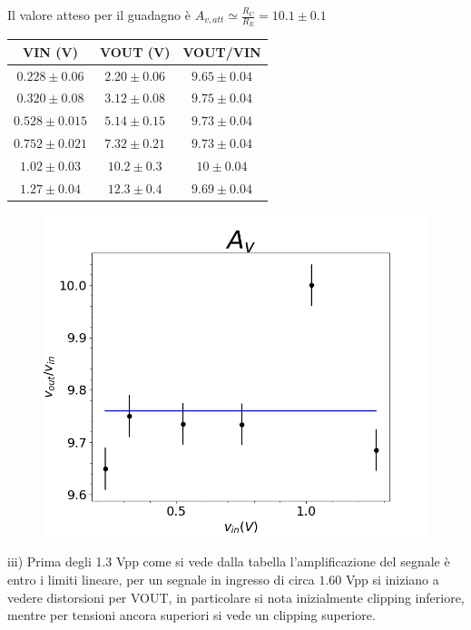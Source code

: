\documentclass[10pt,a4paper]{article}
\begin{document}
Il valore atteso per il guadagno è $A_{v,att} \simeq \frac{R_C}{R_E}= 10.1\pm 0.1$
\begin{table}[h]
	\centering
	\begin{tabular}{|c|c|c|}
		\hline 
		 VIN (\si{\volt}) &  VOUT (\si{\volt})   & VOUT/VIN\\
		\hline 
	$0.228 \pm  0.06 $& $2.20\pm 0.06$& $9.65 \pm 0.04$\\
	$0.320\pm 0.08 $& $3.12 \pm 0.08$& $9.75 \pm0.04$\\
	$0.528\pm 0.015 $& $5.14 \pm 0.15$& $9.73\pm 0.04$ \\
	$0.752\pm 0.021$& $7.32\pm 0.21$ & $9.73\pm 0.04$\\
	$1.02\pm 0.03 $& $10.2\pm 0.3$& $10\pm 0.04 $\\
	$1.27\pm 0.04$ & $12.3\pm 0.4 $& $9.69\pm 0.04 $\\

		\hline 
	\end{tabular} 
\end{table}

\begin{figure}[h]
	\centering
	\includegraphics[scale=0.45]{guadagno.png}

	
	
\end{figure}

iii) Prima degli 1.3 \si{\volt}pp come si vede dalla tabella l'amplificazione del segnale è entro i limiti lineare,  per un segnale in ingresso di circa $1.60$ \si{\volt}pp si iniziano a vedere distorsioni per VOUT, in particolare si nota inizialmente clipping inferiore, mentre per tensioni ancora superiori si vede un clipping superiore.
\end{document}
